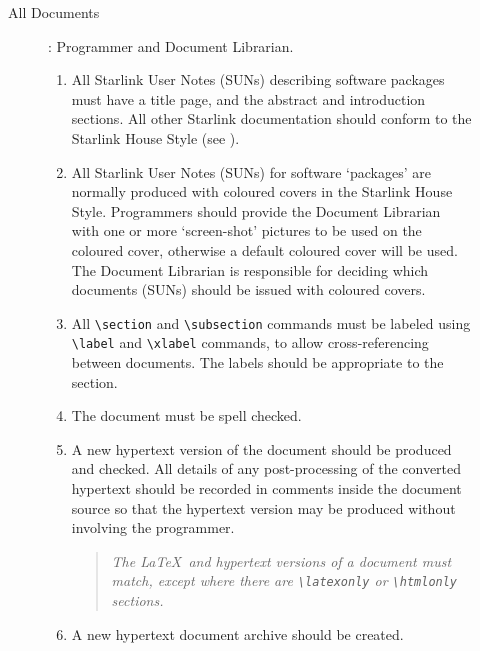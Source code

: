 \begin{description}
\begin{description}
\begin{enumerate}
\end{enumerate}

\item [All Documents]: Programmer and Document Librarian.  

\begin{enumerate}

\item All Starlink User Notes (SUNs) describing software packages  must
have a title page, and the abstract and introduction sections.  All other
Starlink documentation should conform to the Starlink House Style (see
).

\item All Starlink User Notes (SUNs) for software `packages' are normally
produced with coloured covers in the Starlink House Style.  Programmers
should provide the Document Librarian with one or more
`screen-shot' pictures to be used on the coloured cover, otherwise a
default coloured cover will be used.  The Document Librarian is
responsible for deciding which documents (SUNs) should be issued with
coloured covers.

\item All {\verb+\section+} and {\verb+\subsection+} commands must be
labeled using {\verb+\label+} and {\verb+\xlabel+} commands, to allow
cross-referencing between documents.  The labels should be appropriate
to the section.

\item The document must be spell checked.

\item A new hypertext version of the document should be produced and
checked.  All details of any post-processing of the converted hypertext
should be recorded in comments inside the document source so that the
hypertext version may be produced without involving the programmer.

\begin{quote}{\em
The \LaTeX\ and hypertext versions of a document must match, except
where there are {\verb+\latexonly+} or {\verb+\htmlonly+} sections.}
\end{quote}
\item A new hypertext document archive should be created.


\end{enumerate}
\end{description}
\end{description}
